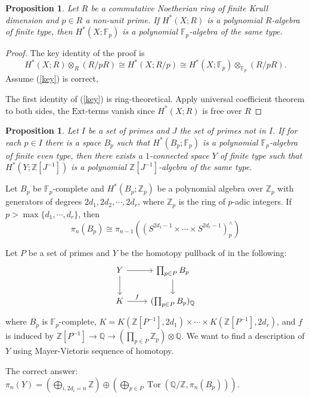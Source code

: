 \documentclass[psamsfonts]{amsart}
\newtheorem{prop}[thm]{Proposition}
\theoremstyle{definition}
\theoremstyle{remark}
\newcommand{\Q}{\mathbb{Q}}
\newcommand{\Z}{\mathbb{Z}}
\newcommand{\F}{\mathbb{F}}
\DeclareMathOperator{\Tor}{Tor}
\numberwithin{equation}{section}
\begin{document}
\begin{prop}
Let $R$ be a commutative Noetherian ring of finite Krull dimension and $p\in R$ a non-unit prime. If $H^\ast(X;R)$ is a polynomial $R$-algebra of finite type, then $H^\ast(X;\F_p)$ is a polynomial $\F_p$-algebra of the same type.
\end{prop}
\begin{proof}
The key identity of the proof is
\begin{equation}\label{key} H^\ast(X;R)\otimes_R (R/pR)\cong H^\ast(X;R/p)\cong H^\ast(X;\F_p)\otimes_{\F_p}(R/pR).
\end{equation}
Assume (\ref{key}) is correct, \medbreak

The first identity of (\ref{key}) is ring-theoretical. Apply universal coefficient theorem to both sides, the $\mathrm{Ext}$-terms vanish since $H^\ast(X;R)$ is free over $R$
\end{proof}


\begin{prop}
Let $I$ be a set of primes and $J$ the set of primes not in $I$. If for each $p\in I$ there is a space $B_p$ such that $H^\ast(B_p;\F_p)$ is a polynomial $\F_p$-algebra of finite even type, then there exists a $1$-connected space $Y$ of finite type such that $H^\ast(Y;\Z[J^{-1}])$ is a polynomial $\Z[J^{-1}]$-algebra of the same type.
\end{prop}

Let $B_p$ be $\F_p$-complete and $H^\ast(B_p;\Z_p)$ be a polynomial algebra over $\Z_p$ with generators of degrees $2d_1,2d_2,\cdots,2d_r$, where $\Z_p$ is the ring of $p$-adic integers. If $p>\max\{d_1,\cdots,d_r\}$, then
\[\pi_n(B_p)\cong\pi_{n-1}\left((S^{2d_1-1}\times\cdots\times S^{2d_r-1})_p^\wedge\right)\]\medbreak

\noindent Let $P$ be a set of primes and $Y$ be the homotopy pullback of in the following:
\[\begin{tikzcd}
Y\arrow[r]\arrow[d]&\prod_{p\in P}B_p\arrow[d]\\
K\arrow[r,"f"]&(\prod_{p\in P}B_p)_\Q
\end{tikzcd}\]
where $B_p$ is $\F_p$-complete, $K=K(\Z[P^{-1}],2d_1)\times\cdots\times K(\Z[P^{-1}],2d_r)$, and $f$ is induced by $\Z[P^{-1}]\to\Q\to(\prod_{p\in P}\Z_p)\otimes\Q$. We want to find a description of $Y$ using Mayer-Vietoris sequence of homotopy.\medbreak

\noindent The correct answer: $\pi_n(Y)=(\bigoplus_{i,2d_i=n}\Z)\oplus(\bigoplus_{p\in P}\Tor(\Q/\Z,\pi_n(B_p)))$.\medbreak
\end{document}
